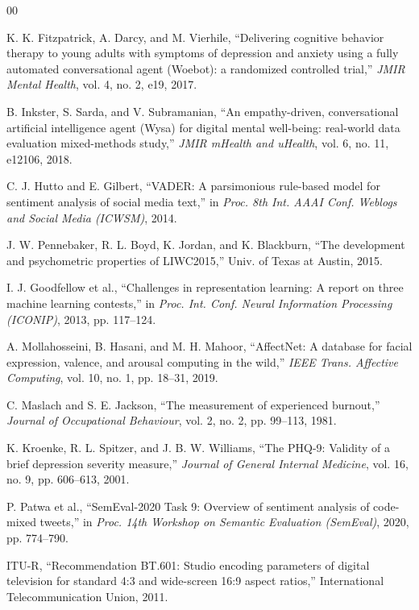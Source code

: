 \documentclass[runningheads]{llncs}
\begin{document}
\begin{thebibliography}{00}

 K. K. Fitzpatrick, A. Darcy, and M. Vierhile, ``Delivering
cognitive behavior therapy to young adults with symptoms of depression and
anxiety using a fully automated conversational agent (Woebot): a randomized
controlled trial,'' \emph{JMIR Mental Health}, vol. 4, no. 2, e19, 2017.

 B. Inkster, S. Sarda, and V. Subramanian, ``An empathy-driven,
conversational artificial intelligence agent (Wysa) for digital mental
well-being: real-world data evaluation mixed-methods study,'' \emph{JMIR
mHealth and uHealth}, vol. 6, no. 11, e12106, 2018.

 C. J. Hutto and E. Gilbert, ``VADER: A parsimonious rule-based
model for sentiment analysis of social media text,'' in \emph{Proc. 8th Int.
AAAI Conf. Weblogs and Social Media (ICWSM)}, 2014.

 J. W. Pennebaker, R. L. Boyd, K. Jordan, and K. Blackburn,
``The development and psychometric properties of LIWC2015,'' Univ. of Texas at
Austin, 2015.

 I. J. Goodfellow et al., ``Challenges in representation
learning: A report on three machine learning contests,'' in \emph{Proc. Int.
Conf. Neural Information Processing (ICONIP)}, 2013, pp. 117--124.

 A. Mollahosseini, B. Hasani, and M. H. Mahoor,
``AffectNet: A database for facial expression, valence, and arousal computing
in the wild,'' \emph{IEEE Trans. Affective Computing}, vol. 10, no. 1, pp.
18--31, 2019.

 C. Maslach and S. E. Jackson, ``The measurement of
experienced burnout,'' \emph{Journal of Occupational Behaviour}, vol. 2, no. 2,
pp. 99--113, 1981.

 K. Kroenke, R. L. Spitzer, and J. B. W. Williams, ``The PHQ-9:
Validity of a brief depression severity measure,'' \emph{Journal of General
Internal Medicine}, vol. 16, no. 9, pp. 606--613, 2001.

 P. Patwa et al., ``SemEval-2020 Task 9: Overview of
sentiment analysis of code-mixed tweets,'' in \emph{Proc. 14th Workshop on
Semantic Evaluation (SemEval)}, 2020, pp. 774--790.

 ITU-R, ``Recommendation BT.601: Studio encoding parameters of
digital television for standard 4:3 and wide-screen 16:9 aspect ratios,''
International Telecommunication Union, 2011.


\end{thebibliography}
\end{document}
